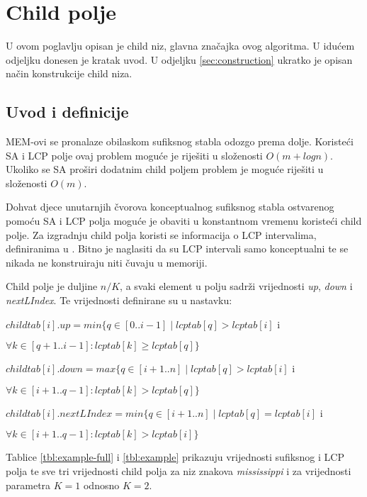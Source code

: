 \documentclass[times, utf8, seminar, numeric]{fer}
\begin{document}
\chapter{Child polje}
\label{ch:child}

U ovom poglavlju opisan je child niz, glavna značajka ovog algoritma. U idućem odjeljku donesen je kratak uvod. U odjeljku \ref{sec:construction} ukratko je opisan način konstrukcije child niza.

\section{Uvod i definicije}
\label{sec:definitions}

MEM-ovi se pronalaze obilaskom sufiksnog stabla odozgo prema dolje. Koristeći SA i LCP polje ovaj problem moguće je riješiti u složenosti $O(m + log n)$. Ukoliko se SA proširi dodatnim child poljem problem je moguće riješiti u složenosti $O(m)$.

Dohvat djece unutarnjih čvorova konceptualnog sufiksnog stabla ostvarenog pomoću SA i LCP polja moguće je obaviti u konstantnom vremenu koristeći child polje. Za izgradnju child polja koristi se informacija o LCP intervalima, definiranima u \cite{esa}. Bitno je naglasiti da su LCP intervali samo konceptualni te se nikada ne konstruiraju niti čuvaju u memoriji.

Child polje je duljine $n / K$, a svaki element u polju sadrži vrijednosti \textit{up}, \textit{down} i \textit{nextLIndex}. Te vrijednosti definirane su u nastavku:

$childtab[i].up = min\{q \in [0..i-1] \mid lcptab[q] > lcptab[i]$ i \\ \strut\hfill 
$\forall k \in [q+1..i-1] : lcptab[k] \geq lcptab[q]\}$

$childtab[i].down = max\{q \in [i+1..n] \mid lcptab[q] > lcptab[i]$ i \\ \strut\hfill
$\forall k \in [i+1..q-1] : lcptab[k] > lcptab[q]\}$

$childtab[i].nextLIndex = min\{q \in [i+1..n] \mid lcptab[q] = lcptab[i]$ i \\ \strut\hfill
$\forall k \in [i+1..q-1] : lcptab[k] > lcptab[i]\}$

Tablice \ref{tbl:example-full} i \ref{tbl:example} prikazuju vrijednosti sufiksnog i LCP polja te sve tri vrijednosti child polja za niz znakova \textit{mississippi} i za vrijednosti parametra $K = 1$ odnosno $K = 2$.
\end{document}
